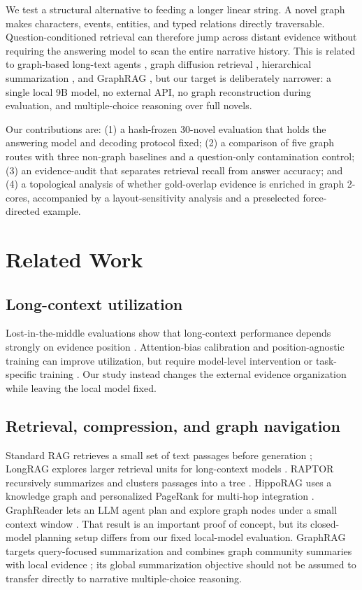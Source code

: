 \documentclass[11pt,a4paper]{article}
\begin{document}
We test a structural alternative to feeding a longer linear string. A novel graph makes characters, events, entities, and typed relations directly traversable. Question-conditioned retrieval can therefore jump across distant evidence without requiring the answering model to scan the entire narrative history. This is related to graph-based long-text agents \citep{li2024graphreader}, graph diffusion retrieval \citep{gutierrez2024hipporag}, hierarchical summarization \citep{sarthi2024raptor}, and GraphRAG \citep{edge2024graphrag}, but our target is deliberately narrower: a single local 9B model, no external API, no graph reconstruction during evaluation, and multiple-choice reasoning over full novels.

Our contributions are: (1) a hash-frozen 30-novel evaluation that holds the answering model and decoding protocol fixed; (2) a comparison of five graph routes with three non-graph baselines and a question-only contamination control; (3) an evidence-audit that separates retrieval recall from answer accuracy; and (4) a topological analysis of whether gold-overlap evidence is enriched in graph 2-cores, accompanied by a layout-sensitivity analysis and a preselected force-directed example.

\section{Related Work}
\subsection{Long-context utilization}
Lost-in-the-middle evaluations show that long-context performance depends strongly on evidence position \citep{liu2024lost}. Attention-bias calibration and position-agnostic training can improve utilization, but require model-level intervention or task-specific training \citep{hsieh2024found}. Our study instead changes the external evidence organization while leaving the local model fixed.

\subsection{Retrieval, compression, and graph navigation}
Standard RAG retrieves a small set of text passages before generation \citep{lewis2020rag}; LongRAG explores larger retrieval units for long-context models \citep{zhao2024longrag}. RAPTOR recursively summarizes and clusters passages into a tree \citep{sarthi2024raptor}. HippoRAG uses a knowledge graph and personalized PageRank for multi-hop integration \citep{gutierrez2024hipporag}. GraphReader lets an LLM agent plan and explore graph nodes under a small context window \citep{li2024graphreader}. That result is an important proof of concept, but its closed-model planning setup differs from our fixed local-model evaluation. GraphRAG targets query-focused summarization and combines graph community summaries with local evidence \citep{edge2024graphrag}; its global summarization objective should not be assumed to transfer directly to narrative multiple-choice reasoning.
\end{document}
